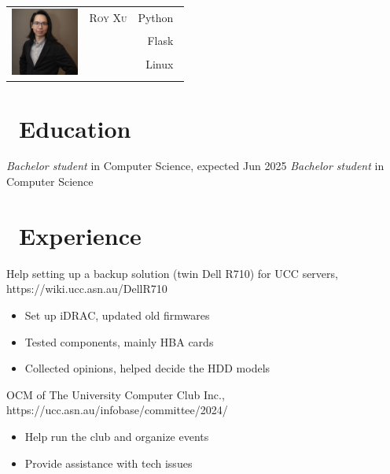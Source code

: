 \documentclass{resume}
\begin{document}

{
\Large{
  \begin{tabu}{ c l r }
    & \scshape{Roy Xu} & {Python~} \\
    &  & {Flask~} \\
    &  & {Linux~} \\
    & 
  \end{tabu}
}
}

\section{\faGraduationCap\ Education}
\textit{Bachelor student} in Computer Science, expected Jun 2025
\textit{Bachelor student} in Computer Science

\section{\faUsers\ Experience}
Help setting up a backup solution (twin Dell R710) for UCC servers, https://wiki.ucc.asn.au/DellR710
\begin{itemize}
  \item Set up iDRAC, updated old firmwares
  \item Tested components, mainly HBA cards
  \item Collected opinions, helped decide the HDD models
\end{itemize}


OCM of The University Computer Club Inc., https://ucc.asn.au/infobase/committee/2024/
\begin{itemize}
  \item Help run the club and organize events
  \item Provide assistance with tech issues
\end{itemize}
\end{document}
